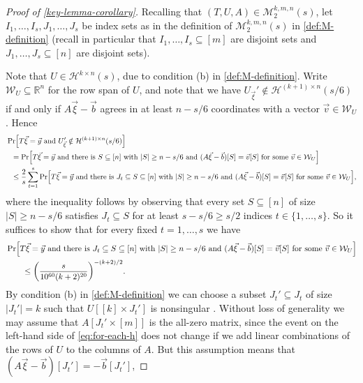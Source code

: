 \documentclass[english]{article}
\theoremstyle{remark}
\numberwithin{equation}{section}
\numberwithin{figure}{section}
\newcommand{\su}{\subseteq}
\newcommand{\RR}{\mathbb{R}}
\newcommand{\mc}{\mathcal}
\let\originalleft\left
\let\originalright\right
\renewcommand{\left}{\mathopen{}\mathclose\bgroup\originalleft}
\renewcommand{\right}{\aftergroup\egroup\originalright}
\begin{document}
\begin{proof}[Proof of \cref{key-lemma-corollary}]Recalling that $(T,U,A)\in \mathcal{M}^{k,m,n}_2(s)$, let $I_1,\dots,I_s,J_1,\dots,J_s$ be index sets as in the definition of $\mathcal{M}^{k,m,n}_2(s)$ in \cref{def:M-definition} (recall in particular that $I_1,\dots,I_s\su [m]$ are disjoint sets and $J_1,\dots,J_s\su [n]$ are disjoint sets).

Note that $U\in \mathcal{H}^{k\times n}(s)$, due to condition (b) in  \cref{def:M-definition}. Write $\mathcal{W}_{U}\subseteq\RR^{n}$ for the row span of $U$, and note that we have $U_{\vec \xi}'\notin \mathcal H^{(k+1)\times n}(s/6)$ if and only if $A\vec \xi-\vec b$ agrees in at least $n-s/6$ coordinates with a vector $\vec v\in \mc W_U$. Hence
\begin{align*}
 & \Pr\Bigl[T\vec{\xi}=\vec{y}\text{ and }U_{\vec \xi}'\notin \mathcal H^{(k+1)\times n}(s/6)\Bigr]\\
& \quad\!\!=\Pr\Bigl[T\vec{\xi}=\vec{y}\text{ and there is }S\subseteq[n]\text{ with }|S|\ge n-s/6\text{ and }(A\vec{\xi}-\vec{b})[S]=\vec{v}[S]\text{ for some }\vec{v}\in\mathcal{W}_{U}\Bigr]\\
 &\quad\!\!\le\frac{2}{s}\sum_{t=1}^{s}\Pr\Bigl[T\vec{\xi}=\vec{y}\text{ and there is }J_t\su S\subseteq[n]\text{ with }|S|\ge n-s/6\text{ and }(A\vec{\xi}-\vec{b})[S]=\vec{v}[S]\text{ for some }\vec{v}\in\mathcal{W}_{U}\Bigr],
\end{align*}
where the inequality follows by observing that every set $S\subseteq[n]$ of size $|S|\ge n-s/6$ satisfies $J_t\su S$ for at least $s-s/6\ge s/2$ indices $t\in \{1,\dots,s\}$. So it suffices to show that for every fixed $t=1,\dots,s$ we have
\begin{align}
&\Pr\Bigl[T\vec{\xi}=\vec{y}\text{ and there is }J_t\su S\subseteq[n]\text{ with }|S|\ge n-s/6\text{ and }(A\vec{\xi}-\vec{b})[S]=\vec{v}[S]\text{ for some }\vec{v}\in\mathcal{W}_{U}\Bigr]\notag\\
&\qquad \le \left(\frac{s}{10^{60}(k+2)^{20}}\right)^{-(k+2)/2}.
\label{eq:for-each-h}
\end{align}
By condition (b) in \cref{def:M-definition} we can choose a subset $J_{t}'\subseteq J_{t}$ of size $|J_t'|=k$ such that $U[[k]\times J_{t}']$ is nonsingular . Without loss of generality we may assume that $A[J_{t}'\times[m]]$
is the all-zero matrix, since the event on the left-hand side of \cref{eq:for-each-h} does not change if we
add linear combinations of the rows of $U$ to the columns of $A$.
But this assumption means that $(A\vec{\xi}-\vec{b})[J_{t}']=-\vec{b}[J_{t}']$,

\end{proof}
\end{document}
